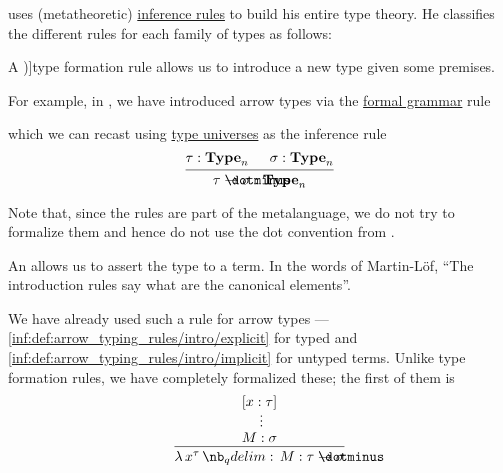 \begin{remark}\label{rem:type_theory_rule_classification}
   uses (metatheoretic) \hyperref[def:inference_rule]{inference rules} to build his entire type theory. He classifies the different rules for each family of types as follows:
  \begin{thmenum}
     A \term[en=formation (rule) (\cite[\S 8.1.9]{Mimram2020ProgramEqualsProof})]{type formation} rule allows us to introduce a new type given some premises.

    For example, in , we have introduced arrow types via the \hyperref[def:formal_grammar/schema]{formal grammar} rule
    \begin{bnf*}
       {\bnftsq{(} \bnfsp {} \bnfsp \bnftsq{\( \synimplies \)} \bnfsp {} \bnfsp \bnftsq{)}}
    \end{bnf*}
    which we can recast using \hyperref[rem:type_universes]{type universes} as the inference rule
    \begin{equation*}
      \begin{prooftree}
        \hypo{ \tau: \op*{Type}_n }
        \hypo{ \sigma: \op*{Type}_n }
        \infer2{ \tau \synimplies \sigma: \op*{Type}_n }
      \end{prooftree}
    \end{equation*}

    Note that, since the rules are part of the metalanguage, we do not try to formalize them and hence do not use the dot convention from .

     An  allows us to assert the type to a term. In the words of Martin-L\"of, \enquote{The introduction rules say what are the canonical elements}.

    We have already used such a rule for arrow types --- \ref{inf:def:arrow_typing_rules/intro/explicit} for typed and \ref{inf:def:arrow_typing_rules/intro/implicit} for untyped terms. Unlike type formation rules, we have completely formalized these; the first of them is
    \begin{equation*}
      \begin{prooftree}
        \hypo{ [x: \tau] }
        \ellipsis {} { M: \sigma }
        \infer1{ \qabs {x^{\tau}} M: \tau \synimplies \sigma }
      \end{prooftree}
    \end{equation*}


\end{thmenum}
\end{remark}
